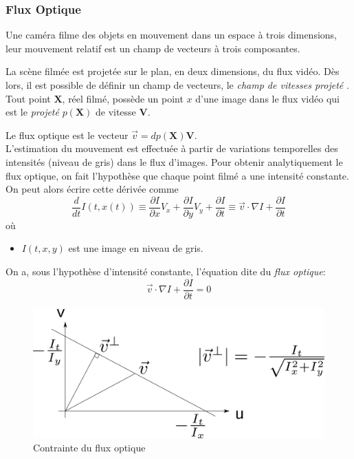 \documentclass[a4paper,12pt]{report}
\begin{document}
\subsubsection{Flux Optique}

Une caméra filme des objets en mouvement dans un espace à trois dimensions, leur mouvement relatif est un champ de vecteurs à trois composantes. 

La scène filmée est projetée sur le plan, en deux dimensions, du flux vidéo. Dès lors, il est possible de définir un champ de vecteurs, le \textit{champ de vitesses projeté} \cite{r}. \\

Tout point $\textbf{X}$, réel filmé, possède un point $x$ d'une image dans le flux vidéo qui est le \textit{projeté} $p(\textbf{X})$ de vitesse $\textbf{V}$. 

Le flux optique est le vecteur $\vec v = dp(\textbf{X})\textbf{V}$.\\
 
L'estimation du mouvement est effectuée à partir de variations temporelles des intensités (niveau de gris) dans le flux d'images. Pour obtenir analytiquement le flux optique, on fait l'hypothèse que chaque point filmé a une intensité constante. On peut alors écrire cette dérivée comme $$\frac{d}{dt}I(t,x(t)) \equiv \frac{\partial I}{\partial x}V_x+\frac{\partial I}{\partial y}V_y+\frac{\partial I}{\partial t} \equiv \vec v \cdot \nabla I + \frac{\partial I}{\partial t}$$
où 
\begin{itemize}
\item[] $I(t,x,y)$ est une image en niveau de gris.\\
\end{itemize}
On a, sous l'hypothèse d'intensité constante, l'équation dite du \textit{flux optique}:
$$\vec v \cdot \nabla I + \frac{\partial I}{\partial t} = 0 $$ 
\begin{figure}[hbtp]
\centering
\includegraphics[scale=0.4]{figureOpticalConstraint.png}
\caption{Contrainte du flux optique}
\end{figure}
\end{document}
